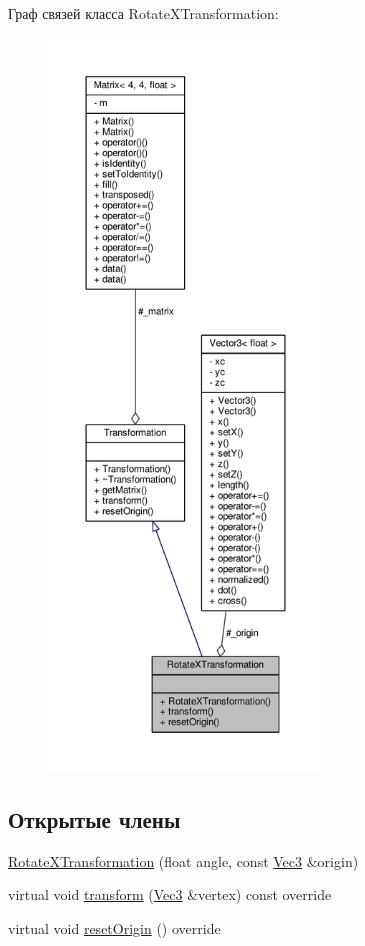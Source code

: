 Граф связей класса Rotate\+X\+Transformation\+:
\nopagebreak
\begin{figure}[H]
\begin{center}
\leavevmode
\includegraphics[height=550pt]{d0/d23/class_rotate_x_transformation__coll__graph}
\end{center}
\end{figure}
\subsection*{Открытые члены}
\begin{DoxyCompactItemize}
\item 
\hyperlink{class_rotate_x_transformation_a90758976e184ef89825281c15ad0f71a}{Rotate\+X\+Transformation} (float angle, const \hyperlink{vec3_8h_a221ad8ea4d9be4111628ee1ca22ee3ba}{Vec3} \&origin)
\item 
virtual void \hyperlink{class_rotate_x_transformation_a4ce10fae3f680ab275e996f9a80aed31}{transform} (\hyperlink{vec3_8h_a221ad8ea4d9be4111628ee1ca22ee3ba}{Vec3} \&vertex) const override
\item 
virtual void \hyperlink{class_rotate_x_transformation_ace8f34cb88796d5a1102387ff55003fd}{reset\+Origin} () override
\end{DoxyCompactItemize}
